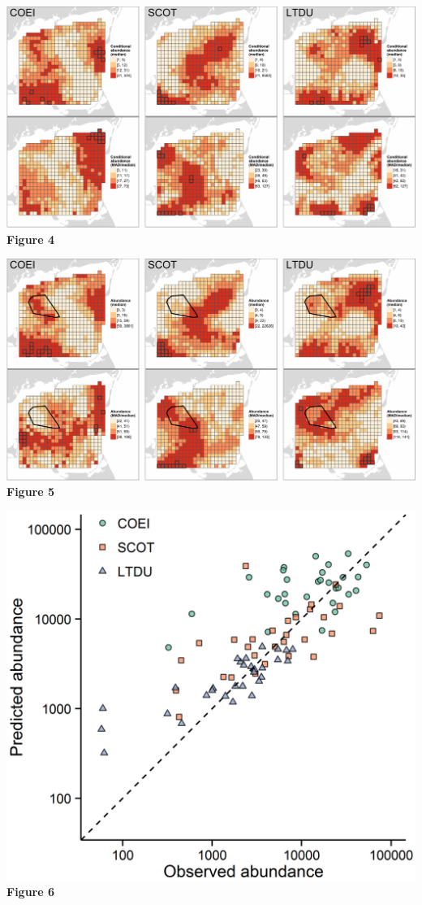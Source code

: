 \newpage

\includegraphics{./Figures/conditional_abundance_maps_reduced.png}\\
\textbf{Figure 4}

\newpage

\includegraphics{./Figures/overall_abundance_maps_reduced.png}\\
\textbf{Figure 5}

\newpage

\includegraphics{./Figures/Predicted_abundance_observed_abundance.png}\\
\textbf{Figure 6}
